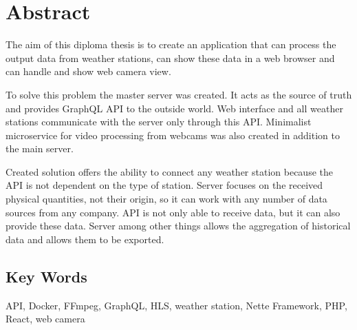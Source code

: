 \chapter*{Abstract}
The aim of this diploma thesis is to create an application that can process the output data from weather stations, can show these data in a web browser and can handle and show web camera view.

To solve this problem the master server was created. It acts as the source of truth and provides GraphQL API to the outside world. Web interface and all weather stations communicate with the server only through this API. Minimalist microservice for video processing from webcams was also created in addition to the main server.

Created solution offers the ability to connect any weather station because the API is not dependent on the type of station. Server focuses on the received physical quantities, not their origin, so it can work with any number of data sources from any company. API is not only able to receive data, but it can also provide these data. Server among other things allows the aggregation of historical data and allows them to be exported.

\vfill

\section*{Key Words}
API, Docker, FFmpeg, GraphQL, HLS, weather station, Nette Framework, PHP, React, web camera

